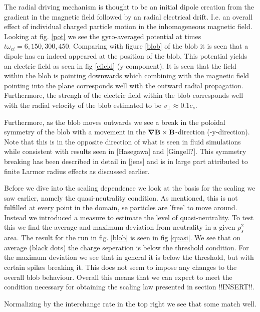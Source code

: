 \documentclass[9pt,twocolumn]{article}
\newcommand{\gv}[1]{\ensuremath{\mbox{\boldmath$ #1 $}}}
\newcommand{\fd}[1]{\mathbf{#1}}
\newcommand{\grad}[1]{\gv{\nabla} #1} %
\renewcommand{\=}[1]{\stackrel{#1}{=}} %
\theoremstyle{definition}
\theoremstyle{remark}
\begin{document}
The radial driving mechanism is thought to be an initial dipole creation from the gradient in the magnetic field followed by an radial electrical drift. I.e. an overall effect of individual charged particle motion in the inhomogeneous magnetic field. Looking at fig. \ref{pot} we see the gyro-averaged potential at times $t\omega_{ci}={6,150,300,450}$. Comparing with figure \ref{blob} of the blob it is seen that a dipole has en indeed appeared at the position of the blob. 
This potential yields an electric field as seen in fig \ref{efield} (y-component). It is seen that the field within the blob is pointing downwards which combining with the magnetic field pointing into the plane corresponds well with the outward radial propagation. Furthermore, the strengh of the electric field within the blob corresponds well with the radial velocity of the blob estimated to be $v_\perp \approx 0.1c_s$. 

Furthermore, as the blob moves outwards we see a break in the poloidal symmetry of the blob with a movement in the $\grad \fd B\times \fd B$-direction (-y-direction). Note that this is in the opposite direction of what is seen in fluid simulations while consistent with results seen in [Hasegawa] and [Gingell?]. This symmetry breaking has been described in detail in [jens] and is in large part attributed to finite Larmor radius effects as discussed earlier. 


Before we dive into the scaling dependence we look at the basis for the scaling we saw earlier, namely the quasi-neutrality condition. As mentioned, this is not fulfilled at every point in the domain, se particles are 'free' to move around. Instead we introduced a measure to estimate the level of quasi-neutrality. To test this we find the average and maximum deviation from neutrality in a given $\rho_s^2$ area. The result for the run in fig. \ref{blob} is seen in fig  \ref{quasi}. We see that on average (black dots) the charge seperation is below the threshold condition. For the maximum deviation we see that in general it is below the threshold, but with certain spikes breaking it. This does not seem to impose any changes to the overall blob behaviour. Overall this means that we can expect to meet the condition necessary for obtaining the scaling law presented in section !!INSERT!!.


Normalizing by the interchange rate in the 
top right we see that some match well.
\end{document}
